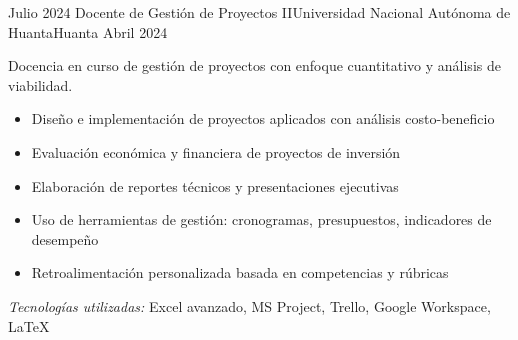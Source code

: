 \begin{experiences}
\experience
{Julio 2024} {Docente de Gestión de Proyectos II}{Universidad Nacional Autónoma de Huanta}{Huanta}
{Abril 2024} {
	Docencia en curso de gestión de proyectos con enfoque cuantitativo y análisis de viabilidad.
	\begin{itemize}
		\item Diseño e implementación de proyectos aplicados con análisis costo-beneficio
		\item Evaluación económica y financiera de proyectos de inversión
		\item Elaboración de reportes técnicos y presentaciones ejecutivas
		\item Uso de herramientas de gestión: cronogramas, presupuestos, indicadores de desempeño
		\item Retroalimentación personalizada basada en competencias y rúbricas
	\end{itemize}
}
{\footnotesize{\emph{Tecnologías utilizadas:} Excel avanzado, MS Project, Trello, Google Workspace, LaTeX}}
\emptySeparator




\end{experiences}
